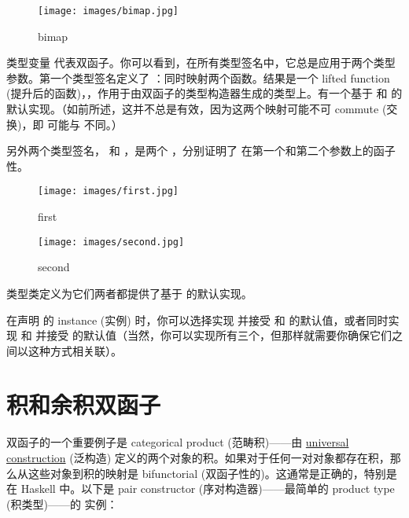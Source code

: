 \begin{figure}[H]
  \centering\texttt{[image: images/bimap.jpg]}
  \caption{bimap}
\end{figure}

类型变量  代表双函子。你可以看到，在所有类型签名中，它总是应用于两个类型参数。第一个类型签名定义了 ：同时映射两个函数。结果是一个 lifted function (提升后的函数)，，作用于由双函子的类型构造器生成的类型上。有一个基于  和  的  默认实现。（如前所述，这并不总是有效，因为这两个映射可能不可 commute (交换)，即  可能与  不同。）


\noindent
另外两个类型签名， 和 ，是两个 ，分别证明了  在第一个和第二个参数上的函子性。

\begin{figure}[H]
  \centering
  \begin{minipage}{0.45\textwidth}
    \centering
    \texttt{[image: images/first.jpg]} %
    \caption{first}
  \end{minipage}\hfill
  \begin{minipage}{0.45\textwidth}
    \centering
    \texttt{[image: images/second.jpg]} %
    \caption{second}
  \end{minipage}
\end{figure}

\noindent
类型类定义为它们两者都提供了基于  的默认实现。

在声明  的 instance (实例) 时，你可以选择实现  并接受  和  的默认值，或者同时实现  和  并接受  的默认值（当然，你可以实现所有三个，但那样就需要你确保它们之间以这种方式相关联）。

\section{积和余积双函子}

双函子的一个重要例子是 categorical product (范畴积)——由 \hyperref[products-and-coproducts]{universal construction} (泛构造) 定义的两个对象的积。如果对于任何一对对象都存在积，那么从这些对象到积的映射是 bifunctorial (双函子性的)。这通常是正确的，特别是在 Haskell 中。以下是 pair constructor (序对构造器)——最简单的 product type (积类型)——的  实例：

